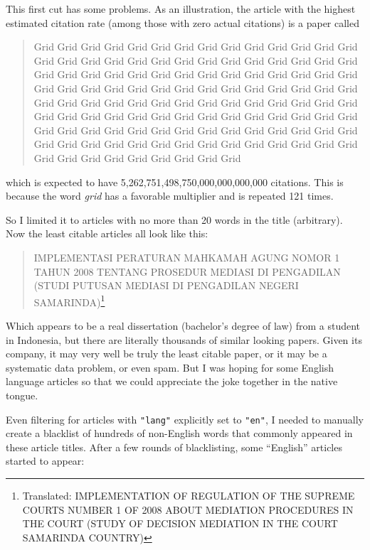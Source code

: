 \documentclass[twocolumn]{article}
\begin{document}
This first cut has some problems. As an illustration, the article
with the highest estimated citation rate (among those with zero actual
citations) is a paper\cite{leigland2009grid} called
\begin{quote}
Grid Grid Grid Grid Grid Grid Grid Grid Grid Grid Grid Grid Grid Grid Grid Grid Grid Grid Grid Grid Grid Grid Grid Grid Grid Grid Grid Grid Grid Grid Grid Grid Grid Grid Grid Grid Grid Grid Grid Grid Grid Grid Grid Grid Grid Grid Grid Grid Grid Grid Grid Grid Grid Grid Grid Grid Grid Grid Grid Grid Grid Grid Grid Grid Grid Grid Grid Grid Grid Grid Grid Grid Grid Grid Grid Grid Grid Grid Grid Grid Grid Grid Grid Grid Grid Grid Grid Grid Grid Grid Grid Grid Grid Grid Grid Grid Grid Grid Grid Grid Grid Grid Grid Grid Grid Grid Grid Grid Grid Grid Grid Grid Grid Grid Grid Grid Grid Grid Grid Grid Grid
\end{quote}
which is expected to have 5,262,751,498,750,000,000,000,000 citations.
This is because the word {\em grid} has a favorable multiplier and is
repeated 121 times. 

So I limited it to articles with no more than 20 words in the title
(arbitrary). Now the least citable articles all look like this:

\begin{quote}
  IMPLEMENTASI PERATURAN MAHKAMAH AGUNG NOMOR 1 TAHUN 2008 TENTANG
  PROSEDUR MEDIASI DI PENGADILAN (STUDI PUTUSAN MEDIASI DI PENGADILAN
  NEGERI SAMARINDA)\footnote{Translated: IMPLEMENTATION OF REGULATION
    OF THE SUPREME COURTS NUMBER 1 OF 2008 ABOUT MEDIATION
    PROCEDURES IN THE COURT (STUDY OF DECISION MEDIATION IN THE COURT
    SAMARINDA COUNTRY)}
\end{quote}

Which appears to be a real dissertation\cite{putri2009implementasi}
(bachelor's degree of law) from a student in Indonesia, but there are
literally thousands of similar looking papers. Given its company, it
may very well be truly the least citable paper, or it may be a systematic
data problem, or even spam. But I was hoping for some English language
articles so that we could appreciate the joke together in the native
tongue. 

Even filtering for articles with \verb+"lang"+ explicitly set to
\verb+"en"+, I needed to manually create a blacklist of hundreds of
non-English words that commonly appeared in these article titles.
After a few rounds of blacklisting, some ``English'' articles started
to appear:

\end{document}
